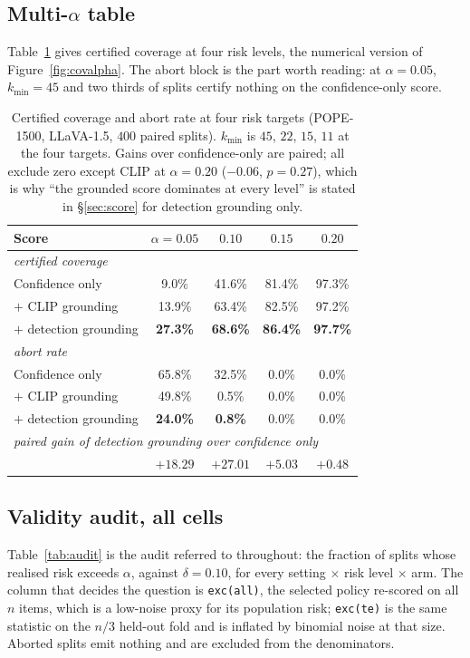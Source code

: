 \documentclass{article}
\theoremstyle{plain}
\theoremstyle{definition}
\theoremstyle{remark}
\begin{document}
\subsection{Multi-$\alpha$ table}
Table~\ref{tab:multialpha} gives certified coverage at four risk levels, the numerical
version of Figure~\ref{fig:covalpha}. The abort block is the part worth reading: at
$\alpha=0.05$, $k_{\min}=45$ and two thirds of splits certify nothing on the confidence-only
score.

\begin{table}[h]
\centering
\caption{Certified coverage and abort rate at four risk targets (POPE-1500, LLaVA-1.5, $400$
paired splits). $k_{\min}$ is $45$, $22$, $15$, $11$ at the four targets. Gains over
confidence-only are paired; all exclude zero except CLIP at $\alpha=0.20$ ($-0.06$, $p=0.27$),
which is why ``the grounded score dominates at every level'' is stated in
\S\ref{sec:score} for detection grounding only.}
\label{tab:multialpha}
\begin{tabular}{lcccc}
\toprule
Score & $\alpha=0.05$ & $0.10$ & $0.15$ & $0.20$\\
\midrule
\multicolumn{5}{l}{\emph{certified coverage}}\\
Confidence only         & \phantom{0}9.0\% & 41.6\% & 81.4\% & 97.3\%\\
$+$ CLIP grounding      & 13.9\% & 63.4\% & 82.5\% & 97.2\%\\
$+$ detection grounding & \textbf{27.3\%} & \textbf{68.6\%} & \textbf{86.4\%} & \textbf{97.7\%}\\
\midrule
\multicolumn{5}{l}{\emph{abort rate}}\\
Confidence only         & 65.8\% & 32.5\% & 0.0\% & 0.0\%\\
$+$ CLIP grounding      & 49.8\% & \phantom{0}0.5\% & 0.0\% & 0.0\%\\
$+$ detection grounding & \textbf{24.0\%} & \phantom{0}\textbf{0.8\%} & 0.0\% & 0.0\%\\
\midrule
\multicolumn{5}{l}{\emph{paired gain of detection grounding over confidence only}}\\
& $+18.29$ & $+27.01$ & $+5.03$ & $+0.48$\\
\bottomrule
\end{tabular}
\end{table}

\subsection{Validity audit, all cells}
\label{app:audit}
Table~\ref{tab:audit} is the audit referred to throughout: the fraction of splits whose realised
risk exceeds $\alpha$, against $\delta=0.10$, for every setting $\times$ risk level $\times$ arm.
The column that decides the question is \texttt{exc(all)}, the selected policy re-scored on all
$n$ items, which is a low-noise proxy for its population risk; \texttt{exc(te)} is the same
statistic on the $n/3$ held-out fold and is inflated by binomial noise at that size. Aborted
splits emit nothing and are excluded from the denominators.
\end{document}
